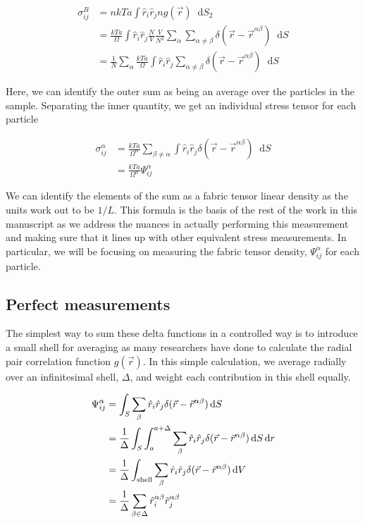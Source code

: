 \documentclass[twocolumn,amsmath,amssymb]{revtex4}
\newcommand*\diff{\mathop{}\!\mathrm{d}}
\begin{document}
\begin{align*}
    \sigma^{B}_{ij} &= nkTa \int \hat{r}_i \hat{r}_j n g(\vec{r}) \diff S_2 \\
                    &= \frac{kTa}{\Omega} \int \hat{r}_i \hat{r}_j \frac{N}{V} \frac{V}{N^2} \sum_{\alpha} \sum_{\alpha\neq\beta} \delta(\vec{r} - \vec{r}^{\alpha\beta}) \diff S \\
                    &= \frac{1}{N} \sum_{\alpha} \frac{kTa}{\Omega} \int \hat{r}_i \hat{r}_j \sum_{\alpha\neq\beta} \delta(\vec{r} - \vec{r}^{\alpha\beta}) \diff S
\end{align*}

Here, we can identify the outer sum as being an average over the particles in
the sample. Separating the inner quantity, we get an individual stress tensor
for each particle 

\begin{align}
    \sigma^{\alpha}_{ij} &= \frac{kTa}{\Omega^{\alpha}} \sum_{\beta\neq\alpha} \int \hat{r}_{i} \hat{r}_{j} \delta(\vec{r}-\vec{r}^{\alpha\beta}) \diff S \\
                         &= \frac{kTa}{\Omega^{\alpha}} \Psi^{\alpha}_{ij}
\end{align}

We can identify the elements of the sum as a fabric tensor linear density as
the units work out to be $1/L$.  This formula is the basis of the rest of the
work in this manuscript as we address the nuances in actually performing this
measurement and making sure that it lines up with other equivalent stress
measurements. In particular, we will be focusing on measuring the fabric
tensor density, $\Psi^{\alpha}_{ij}$ for each particle.

\subsection{Perfect measurements}

The simplest way to sum these delta functions in a controlled way is to
introduce a small shell for averaging as many researchers have done to
calculate the radial pair correlation function $g(\vec{r})$.  In this simple
calculation, we average radially over an infinitesimal shell, $\Delta$, and
weight each contribution in this shell equally.

\begin{align*}
    \Psi^{\alpha}_{ij} &= \int_S \sum_{\beta} \hat{r}_i \hat{r}_j \delta(\vec{r}-\vec{r}^{\alpha\beta}) \diff S \\
                       &= \frac{1}{\Delta} \int_S \int_{a}^{a+\Delta} \sum_{\beta} \hat{r}_i \hat{r}_j \delta(\vec{r}-\vec{r}^{\alpha\beta}) \diff S \diff r \\
                       &= \frac{1}{\Delta} \int_{\rm{shell}} \sum_{\beta} \hat{r}_i \hat{r}_j \delta(\vec{r}-\vec{r}^{\alpha\beta}) \diff V \\
                       &= \frac{1}{\Delta} \sum_{\beta\in\Delta} \hat{r}^{\alpha\beta}_i \hat{r}^{\alpha\beta}_j
\end{align*}
\end{document}

